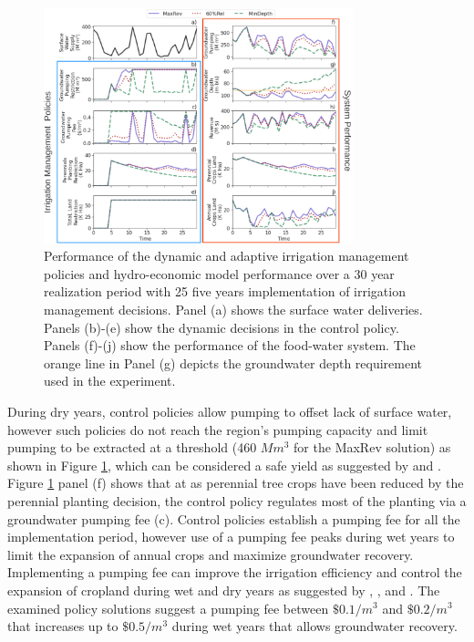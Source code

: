 \documentclass[a4paper,fleqn]{cas-sc}
\begin{document}
\begin{figure}[htb!]
    \includegraphics[width=0.8\textwidth,center]{./figs/selected_highsd_performance.png}
    \caption{Performance of the dynamic and adaptive irrigation management policies and hydro-economic model performance over a 30 year realization period with 25 five years implementation of irrigation management decisions. Panel (a) shows the surface water deliveries. Panels (b)-(e) show the dynamic decisions in the control policy. Panels (f)-(j) show the performance of the food-water system. The orange line in Panel (g) depicts the groundwater depth requirement used in the experiment.} \label{fig:6}
\end{figure}

During dry years, control policies allow pumping to offset lack of surface water, however such policies do not reach the region’s pumping capacity and limit pumping to be extracted at a threshold (460 $M m^3$ for the MaxRev solution) as shown in Figure \ref{fig:6}, which can be considered a safe yield as suggested by \citet{miro_framework_2019} and \citet{macewan_hydroeconomic_2017}. Figure \ref{fig:6} panel (f) shows that at as perennial tree crops have been reduced by the perennial planting decision, the control policy regulates most of the planting via a groundwater pumping fee (c). Control policies establish a pumping fee for all the implementation period, however use of a pumping fee peaks during wet years to limit the expansion of annual crops and maximize groundwater recovery. Implementing a pumping fee can improve the irrigation efficiency and control the expansion of cropland during wet and dry years as suggested by \citet{stone_economic_2022}, \citet{graveline_combining_2020}, and \citet{khan_effect_2019}. The examined policy solutions suggest a pumping fee between $\$0.1/m^{3}$ and $\$0.2/m^{3}$ that increases up to $\$0.5/m^{3}$ during wet years that allows groundwater recovery.
\end{document}
